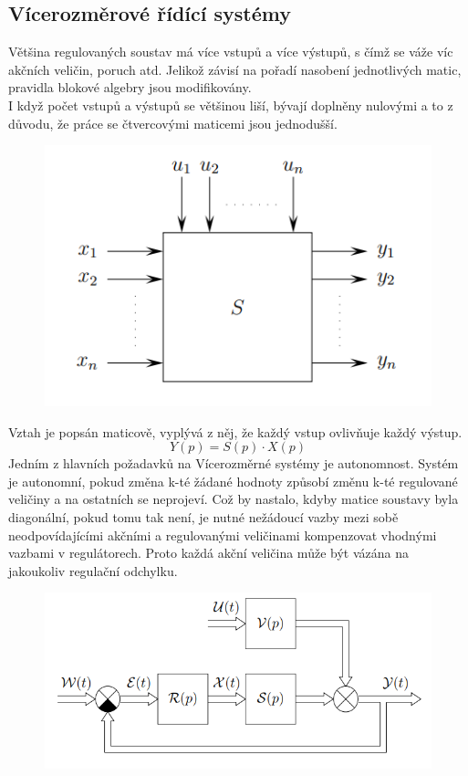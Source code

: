 \subsection*{Vícerozměrové řídící systémy}
Většina regulovaných soustav má více vstupů a více výstupů, s čímž se váže víc akčních veličin, poruch atd. Jelikož závisí na pořadí nasobení jednotlivých matic, pravidla blokové algebry jsou modifikovány.\\
I když počet vstupů a výstupů se většinou liší, bývají doplněny nulovými a to z důvodu, že práce se čtvercovými maticemi jsou jednodušší.
\begin{figure}[H]
    \includegraphics*[scale = 1]{images/vicerozmerneSoustavy.png}
\end{figure}
Vztah je popsán maticově, vyplývá z něj, že každý vstup ovlivňuje každý výstup.
\begin{equation}
    Y(p) = S(p)\cdot X(p)
\end{equation}
Jedním z hlavních požadavků na Vícerozměrné systémy je autonomnost. Systém je autonomní, pokud změna k-té žádané hodnoty způsobí změnu k-té regulované veličiny a na ostatních se neprojeví. Což by nastalo, kdyby matice soustavy byla diagonální, pokud tomu tak není, je nutné nežádoucí vazby mezi sobě neodpovídajícími akčními a regulovanými veličinami kompenzovat vhodnými vazbami v regulátorech. Proto každá akční veličina může být vázána na jakoukoliv regulační odchylku.\\
\begin{figure}[H]
    \includegraphics*[scale = 1]{images/vicerozmerneSoustavySchema.png}
\end{figure}
